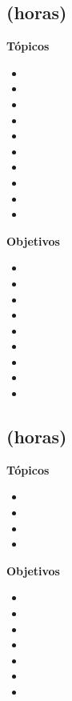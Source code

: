 \subsection{\OSTRESDef  (\OSTRESHours horas)}\label{sec:BOK-OS3}

\textbf{Tópicos}
\begin{itemize}
	\item \OSTRESTopicEstados
	\item \OSTRESTopicEstructuras
	\item \OSTRESTopicDespachos
	\item \OSTRESTopicEl
	\item \OSTRESTopicEjecucion
	\item \OSTRESTopicElproblema
	\item \OSTRESTopicDeadlock
	\item \OSTRESTopicModelos
	\item \OSTRESTopicProblemas
	\item \OSTRESTopicProblemasde
\end{itemize}

\textbf{Objetivos}
\begin{itemize}
	\item \OSTRESObjUNO
	\item \OSTRESObjDOS
	\item \OSTRESObjTRES
	\item \OSTRESObjCUATRO
	\item \OSTRESObjCINCO
	\item \OSTRESObjSEIS
	\item \OSTRESObjSIETE
	\item \OSTRESObjOCHO
	\item \OSTRESObjNUEVE
\end{itemize}

\subsection{\OSCUATRODef  (\OSCUATROHours horas)}\label{sec:BOK-OS4}

\textbf{Tópicos}
\begin{itemize}
	\item \OSCUATROTopicPlaneamiento
	\item \OSCUATROTopicPlaneamientoy
	\item \OSCUATROTopicProcesos
	\item \OSCUATROTopicDeadlines
\end{itemize}

\textbf{Objetivos}
\begin{itemize}
	\item \OSCUATROObjUNO
	\item \OSCUATROObjDOS
	\item \OSCUATROObjTRES
	\item \OSCUATROObjCUATRO
	\item \OSCUATROObjCINCO
	\item \OSCUATROObjSEIS
	\item \OSCUATROObjSIETE
\end{itemize}

